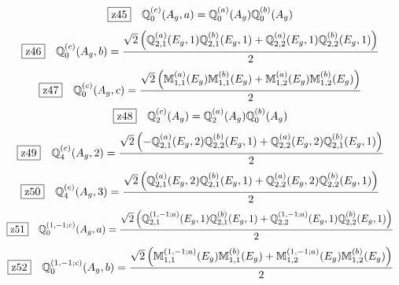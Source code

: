 \documentclass[fleqn,10pt,landscape]{jsarticle}
\begin{document}
\begin{dmath*}
\hspace*{3mm}\fbox{z45}\quad \mathbb{Q}_{0}^{(c)}(A_{g},a)=\mathbb{Q}_{0}^{(a)}(A_{g}) \mathbb{Q}_{0}^{(b)}(A_{g})
\end{dmath*}
\begin{dmath*}
\hspace*{3mm}\fbox{z46}\quad \mathbb{Q}_{0}^{(c)}(A_{g},b)=\frac{\sqrt{2} \left(\mathbb{Q}_{2,1}^{(a)}(E_{g},1) \mathbb{Q}_{2,1}^{(b)}(E_{g},1) + \mathbb{Q}_{2,2}^{(a)}(E_{g},1) \mathbb{Q}_{2,2}^{(b)}(E_{g},1)\right)}{2}
\end{dmath*}
\begin{dmath*}
\hspace*{3mm}\fbox{z47}\quad \mathbb{Q}_{0}^{(c)}(A_{g},c)=\frac{\sqrt{2} \left(\mathbb{M}_{1,1}^{(a)}(E_{g}) \mathbb{M}_{1,1}^{(b)}(E_{g}) + \mathbb{M}_{1,2}^{(a)}(E_{g}) \mathbb{M}_{1,2}^{(b)}(E_{g})\right)}{2}
\end{dmath*}
\begin{dmath*}
\hspace*{3mm}\fbox{z48}\quad \mathbb{Q}_{2}^{(c)}(A_{g})=\mathbb{Q}_{2}^{(a)}(A_{g}) \mathbb{Q}_{0}^{(b)}(A_{g})
\end{dmath*}
\begin{dmath*}
\hspace*{3mm}\fbox{z49}\quad \mathbb{Q}_{4}^{(c)}(A_{g},2)=\frac{\sqrt{2} \left(- \mathbb{Q}_{2,1}^{(a)}(E_{g},2) \mathbb{Q}_{2,2}^{(b)}(E_{g},1) + \mathbb{Q}_{2,2}^{(a)}(E_{g},2) \mathbb{Q}_{2,1}^{(b)}(E_{g},1)\right)}{2}
\end{dmath*}
\begin{dmath*}
\hspace*{3mm}\fbox{z50}\quad \mathbb{Q}_{4}^{(c)}(A_{g},3)=\frac{\sqrt{2} \left(\mathbb{Q}_{2,1}^{(a)}(E_{g},2) \mathbb{Q}_{2,1}^{(b)}(E_{g},1) + \mathbb{Q}_{2,2}^{(a)}(E_{g},2) \mathbb{Q}_{2,2}^{(b)}(E_{g},1)\right)}{2}
\end{dmath*}
\begin{dmath*}
\hspace*{3mm}\fbox{z51}\quad \mathbb{Q}_{0}^{(1,-1;c)}(A_{g},a)=\frac{\sqrt{2} \left(\mathbb{Q}_{2,1}^{(1,-1;a)}(E_{g},1) \mathbb{Q}_{2,1}^{(b)}(E_{g},1) + \mathbb{Q}_{2,2}^{(1,-1;a)}(E_{g},1) \mathbb{Q}_{2,2}^{(b)}(E_{g},1)\right)}{2}
\end{dmath*}
\begin{dmath*}
\hspace*{3mm}\fbox{z52}\quad \mathbb{Q}_{0}^{(1,-1;c)}(A_{g},b)=\frac{\sqrt{2} \left(\mathbb{M}_{1,1}^{(1,-1;a)}(E_{g}) \mathbb{M}_{1,1}^{(b)}(E_{g}) + \mathbb{M}_{1,2}^{(1,-1;a)}(E_{g}) \mathbb{M}_{1,2}^{(b)}(E_{g})\right)}{2}
\end{dmath*}
\end{document}
